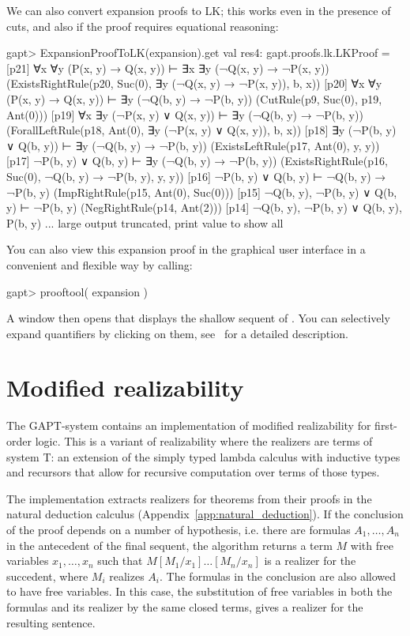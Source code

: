 \documentclass[a4paper,11pt]{book}
\newcommand{\cli}[1]{{\ttfamily {#1}}}
\begin{document}
We can also convert expansion proofs to LK; this works even in the presence of
cuts, and also if the proof requires equational reasoning:
\begin{clilisting}
gapt> ExpansionProofToLK(expansion).get
val res4: gapt.proofs.lk.LKProof = [p21] ∀x ∀y (P(x, y) → Q(x, y)) ⊢ ∃x ∃y (¬Q(x, y) → ¬P(x, y))    (ExistsRightRule(p20, Suc(0), ∃y (¬Q(x, y) → ¬P(x, y)), b, x))
[p20] ∀x ∀y (P(x, y) → Q(x, y)) ⊢ ∃y (¬Q(b, y) → ¬P(b, y))    (CutRule(p9, Suc(0), p19, Ant(0)))
[p19] ∀x ∃y (¬P(x, y) ∨ Q(x, y)) ⊢ ∃y (¬Q(b, y) → ¬P(b, y))    (ForallLeftRule(p18, Ant(0), ∃y (¬P(x, y) ∨ Q(x, y)), b, x))
[p18] ∃y (¬P(b, y) ∨ Q(b, y)) ⊢ ∃y (¬Q(b, y) → ¬P(b, y))    (ExistsLeftRule(p17, Ant(0), y, y))
[p17] ¬P(b, y) ∨ Q(b, y) ⊢ ∃y (¬Q(b, y) → ¬P(b, y))    (ExistsRightRule(p16, Suc(0), ¬Q(b, y) → ¬P(b, y), y, y))
[p16] ¬P(b, y) ∨ Q(b, y) ⊢ ¬Q(b, y) → ¬P(b, y)    (ImpRightRule(p15, Ant(0), Suc(0)))
[p15] ¬Q(b, y), ¬P(b, y) ∨ Q(b, y) ⊢ ¬P(b, y)    (NegRightRule(p14, Ant(2)))
[p14] ¬Q(b, y), ¬P(b, y) ∨ Q(b, y), P(b, y)  ... large output truncated, print value to show all

\end{clilisting}

You can also view this expansion proof in the graphical user interface in
a convenient and flexible way by calling:
\begin{clilisting}
gapt> prooftool( expansion )

\end{clilisting}

A window then opens that displays the shallow sequent of \cli{expansion}.  You
can selectively expand quantifiers by clicking on them,
see~\cite{Hetzl13Understanding} for a detailed description.

\section{Modified realizability}

The GAPT-system contains an implementation of modified realizability for first-order logic. This is a variant of realizability where the realizers are terms of system T: an extension of the simply typed lambda calculus with inductive types and recursors that allow for recursive computation over terms of those types.

The implementation extracts realizers for theorems from their proofs in the natural deduction calculus (Appendix~\ref{app:natural_deduction}). If the conclusion of the proof depends on a number of hypothesis, i.e. there are formulas $A_1,\dots,A_n$ in the antecedent of the final sequent, the algorithm returns a term $M$ with free variables  $x_1,\dots,x_n$ such that $M[M_1/x_1]\dots[M_n/x_n]$ is a realizer for the succedent, where $M_i$ realizes $A_i$. The formulas in the conclusion are also allowed to have free variables. In this case, the substitution of free variables in both the formulas and its realizer by the same closed terms, gives a realizer for the resulting sentence.
\end{document}
